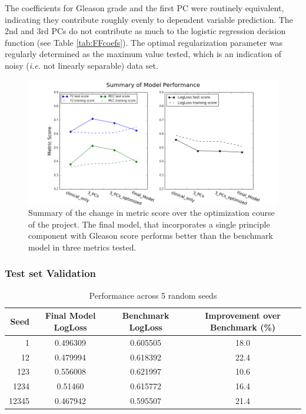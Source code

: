 \documentclass[final]{article}
\begin{document}
The coefficients for Gleason grade and the first PC were routinely equivalent,
indicating they contribute roughly evenly to dependent variable prediction.  The
2nd and 3rd PCs do not contribute as much to the logistic regression decision
function (see Table \ref{tab:FFcoefs}).  The optimal regularization parameter
was regularly determined as the maximum value tested, which is an indication of
noisy (\textit{i.e.} not linearly separable) data set.

\begin{figure}[h!]
  \centering
  \includegraphics[width=\textwidth]{FF}
  \caption{Summary of the change in metric score over the optimization course of the project.  The final model, that incorporates a single principle component with Gleason score performs better than the benchmark model in three metrics tested.\label{fig:FM}}
\end{figure}

\subsubsection{Test set Validation}

\begin{table}[h]
\centering
\caption{Performance across 5 random seeds\label{tab:performance}}
\begin{tabular}[h]{ r c c c }
\hline
Seed & Final Model LogLoss & Benchmark LogLoss & Improvement over Benchmark (\%) \\  \hline
1 & 0.496309 & 0.605505 & 18.0 \\
12 & 0.479994 & 0.618392 & 22.4 \\
123 & 0.556008 & 0.621997 & 10.6 \\
1234 & 0.51460 & 0.615772 & 16.4 \\
12345 & 0.467942 & 0.595507 & 21.4 \\
\hline
\end{tabular}
\end{table}
\end{document}
